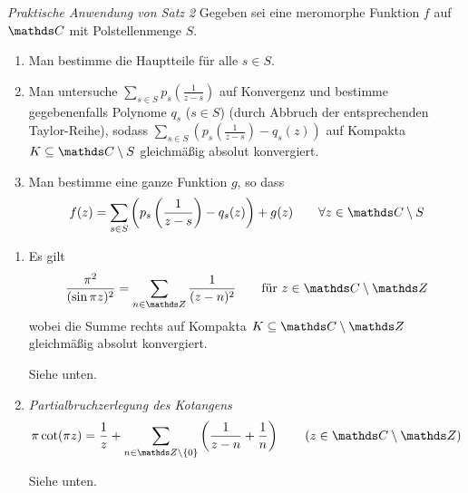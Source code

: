 \emph{Praktische Anwendung von Satz 2} Gegeben sei eine meromorphe Funktion $f$ auf $\CC$ mit Polstellenmenge $S$.
\begin{enumerate}
\item Man bestimme die Hauptteile für alle $s\in S$.
\item Man untersuche $\sum _{s\in S} p_s(\frac{1}{z-s})$ auf Konvergenz und bestimme gegebenenfalls Polynome $q_s$ ($s\in S$) (durch Abbruch der entsprechenden Taylor-Reihe), sodass $\sum _{s\in S} (p_s(\frac{1}{z-s})-q_s(z))$ auf Kompakta $K \subseteq \CC\setminus S$ gleichmäßig absolut konvergiert.
\item Man bestimme eine ganze Funktion $g$, so dass
\[
	f(z) = \sum_{s\in S} \left(p_s\left(\frac{1}{z-s}\right)-q_s(z)\right) + g(z) \qquad \forall z\in \CC\setminus S
\]
\end{enumerate}

\begin{bsp}
\begin{enumerate}
\item Es gilt
\begin{equation}\label{eqn:bsp1.3.i}
	\frac{\pi^2}{(\sin \pi z)^2} = \sum _ {n \in \ZZ} \frac{1}{(z-n)^2} \qquad \text{für } z\in \CC\setminus\ZZ
\end{equation}
wobei die Summe rechts auf Kompakta $K \subseteq \CC\setminus\ZZ$ gleichmäßig absolut konvergiert.
\begin{bewe}
Siehe unten.
\end{bewe}

\item \emph{Partialbruchzerlegung des Kotangens}
\begin{equation}\label{eqn:bsp1.3.ii}
	\pi\cot(\pi z)
	= \frac{1}{z} + \sum _{n \in \ZZ\setminus\{0\}} \left( \frac{1}{z-n} + \frac{1}{n}\right)
	\qquad (z \in \CC\setminus\ZZ)
\end{equation}

\begin{bewe}
Siehe unten.
\end{bewe}
\end{enumerate}
\end{bsp}


